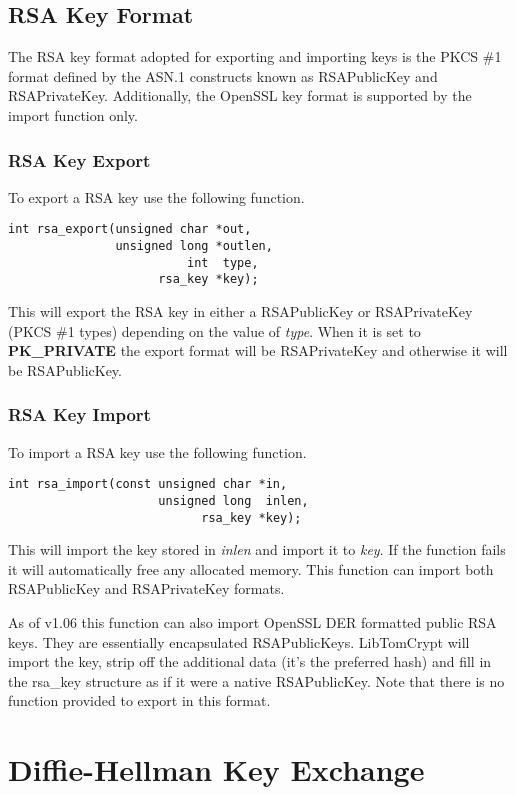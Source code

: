 \documentclass[synpaper]{book}
\newcommand{\mysection}[1]    %
	{                   %
	\section{#1}
   \markboth{\textsf{www.libtom.org}}{\thesection ~ {#1}}
	}
\begin{document}
\mysection{RSA Key Format}

The RSA key format adopted for exporting and importing keys is the PKCS \#1 format defined by the ASN.1 constructs known as
RSAPublicKey and RSAPrivateKey.  Additionally, the OpenSSL key format is supported by the import function only.

\subsection{RSA Key Export}
To export a RSA key use the following function.

\begin{verbatim}
int rsa_export(unsigned char *out,
               unsigned long *outlen,
                         int  type,
                     rsa_key *key);
\end{verbatim}
This will export the RSA key in either a RSAPublicKey or RSAPrivateKey (PKCS \#1 types) depending on the value of \textit{type}.  When it is
set to \textbf{PK\_PRIVATE} the export format will be RSAPrivateKey and otherwise it will be RSAPublicKey.

\subsection{RSA Key Import}
To import a RSA key use the following function.

\begin{verbatim}
int rsa_import(const unsigned char *in,
                     unsigned long  inlen,
                           rsa_key *key);
\end{verbatim}

This will import the key stored in \textit{inlen} and import it to \textit{key}.  If the function fails it will automatically free any allocated memory.  This
function can import both RSAPublicKey and RSAPrivateKey formats.

As of v1.06 this function can also import OpenSSL DER formatted public RSA keys.  They are essentially encapsulated RSAPublicKeys.  LibTomCrypt will
import the key, strip off the additional data (it's the preferred hash) and fill in the rsa\_key structure as if it were a native RSAPublicKey.  Note that
there is no function provided to export in this format.


\chapter{Diffie-Hellman Key Exchange}
\end{document}
